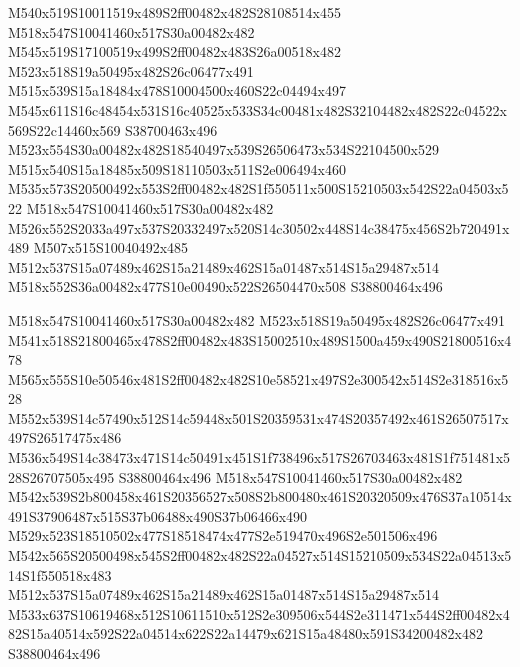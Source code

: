 \documentclass{article}
\begin{document}
\begin{multicols}{2}
M540x519S10011519x489S2ff00482x482S28108514x455 M518x547S10041460x517S30a00482x482 M545x519S17100519x499S2ff00482x483S26a00518x482 M523x518S19a50495x482S26c06477x491 M515x539S15a18484x478S10004500x460S22c04494x497 M545x611S16c48454x531S16c40525x533S34c00481x482S32104482x482S22c04522x569S22c14460x569 S38700463x496 M523x554S30a00482x482S18540497x539S26506473x534S22104500x529 M515x540S15a18485x509S18110503x511S2e006494x460 M535x573S20500492x553S2ff00482x482S1f550511x500S15210503x542S22a04503x522 M518x547S10041460x517S30a00482x482 M526x552S2033a497x537S20332497x520S14c30502x448S14c38475x456S2b720491x489 M507x515S10040492x485 M512x537S15a07489x462S15a21489x462S15a01487x514S15a29487x514 M518x552S36a00482x477S10e00490x522S26504470x508 S38800464x496

M518x547S10041460x517S30a00482x482 M523x518S19a50495x482S26c06477x491 M541x518S21800465x478S2ff00482x483S15002510x489S1500a459x490S21800516x478 M565x555S10e50546x481S2ff00482x482S10e58521x497S2e300542x514S2e318516x528 M552x539S14c57490x512S14c59448x501S20359531x474S20357492x461S26507517x497S26517475x486 M536x549S14c38473x471S14c50491x451S1f738496x517S26703463x481S1f751481x528S26707505x495 S38800464x496 M518x547S10041460x517S30a00482x482 M542x539S2b800458x461S20356527x508S2b800480x461S20320509x476S37a10514x491S37906487x515S37b06488x490S37b06466x490 M529x523S18510502x477S18518474x477S2e519470x496S2e501506x496 M542x565S20500498x545S2ff00482x482S22a04527x514S15210509x534S22a04513x514S1f550518x483 M512x537S15a07489x462S15a21489x462S15a01487x514S15a29487x514 M533x637S10619468x512S10611510x512S2e309506x544S2e311471x544S2ff00482x482S15a40514x592S22a04514x622S22a14479x621S15a48480x591S34200482x482 S38800464x496


\end{multicols}
\end{document}
